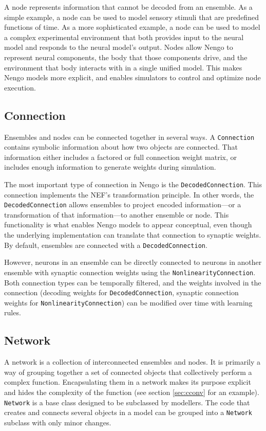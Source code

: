 \documentclass{frontiersSCNS}
\begin{document}
A node represents information
that cannot be decoded from an ensemble.
As a simple example,
a node can be used to model sensory stimuli
that are predefined functions of time.
As a more sophisticated example,
a node can be used to model
a complex experimental environment that
both provides input to the neural model
and responds to the neural model's output.
Nodes allow Nengo to represent
neural components,
the body that those components drive,
and the environment that body interacts with
in a single unified model.
This makes Nengo models more explicit,
and enables simulators
to control and optimize node execution.

\subsection{Connection}

Ensembles and nodes can be connected together
in several ways.
A \texttt{Connection} contains symbolic information
about how two objects are connected.
That information either includes
a factored or full connection weight matrix,
or includes enough information
to generate weights during simulation.

The most important type of connection
in Nengo is the \texttt{DecodedConnection}.
This connection implements
the NEF's transformation principle.
In other words, the \texttt{DecodedConnection}
allows ensembles to project
encoded information---or
a transformation of that information---to
another ensemble or node.
This functionality is what enables Nengo models
to appear conceptual,
even though the underlying implementation
can translate that connection
to synaptic weights.
By default, ensembles are connected
with a \texttt{DecodedConnection}.

However, neurons in an ensemble can be directly connected
to neurons in another ensemble
with synaptic connection weights
using the \texttt{NonlinearityConnection}.
Both connection types
can be temporally filtered,
and the weights involved in the connection
(decoding weights for \texttt{DecodedConnection},
synaptic connection weights for \texttt{NonlinearityConnection})
can be modified over time with learning rules.

\subsection{Network}

A network is a collection of interconnected ensembles and nodes.
It is primarily a way of grouping together
a set of connected objects
that collectively perform a complex function.
Encapsulating them in a network
makes its purpose explicit
and hides the complexity of the function
(see section \ref{sec:cconv} for an example).
\texttt{Network} is a base class designed to be
subclassed by modellers.
The code that creates and connects
several objects in a model can be
grouped into a \texttt{Network} subclass
with only minor changes.
\end{document}
